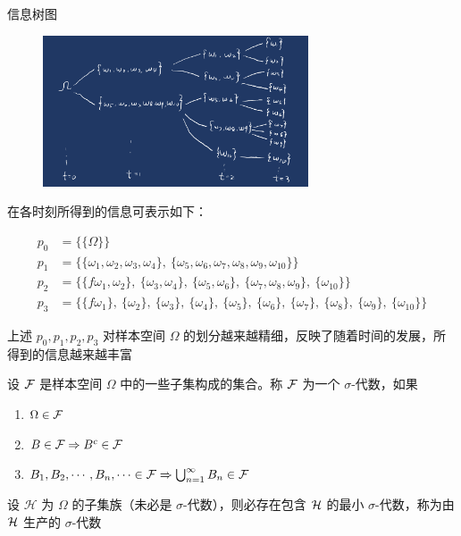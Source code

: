 信息树图

\begin{figure}[H]
    \centering
    \includegraphics[width=0.7\textwidth]{figures/信息树图.jpeg} %
\end{figure}

在各时刻所得到的信息可表示如下：

\begin{align*}
    p_0 &= \big\{ \{\Omega\} \big\} \\[8pt]
    p_1 &= \big\{ \{\omega_1, \omega_2, \omega_3, \omega_4\},\ \{\omega_5, \omega_6, \omega_7, \omega_8, \omega_9, \omega_{10}\} \big\} \\[8pt]
    p_2 &= \big\{ \{f\omega_1, \omega_2\},\ \{\omega_3, \omega_4\},\ \{\omega_5, \omega_6\},\ \{\omega_7, \omega_8, \omega_9\},\ \{\omega_{10}\} \big\} \\[8pt]
    p_3 &= \big\{ \{f\omega_1\},\ \{\omega_2\},\ \{\omega_3\},\ \{\omega_4\},\ \{\omega_5\},\ \{\omega_6\},\ \{\omega_7\},\ \{\omega_8\},\ \{\omega_9\},\ \{\omega_{10}\} \big\}
\end{align*}

上述 $p_0,p_1,p_2,p_3$ 对样本空间 $\Omega$ 的划分越来越精细，反映了随着时间的发展，所得到的信息越来越丰富

\begin{definition}[$\sigma$-代数]
    设 $\mathcal{F}$ 是样本空间 $\Omega$ 中的一些子集构成的集合。称 $\mathcal{F}$ 为一个 $\sigma$-代数，如果
    \begin{enumerate}
        \item $\Omega\in \mathcal{F}$
        \item $B\in \mathcal{F}\Rightarrow B^c\in\mathcal{F}$
        \item $B_1,B_2,\cdots,B_n,\cdots\in \mathcal{F}\Rightarrow \bigcup_{n=1}^{\infty}B_n\in \mathcal{F}$
    \end{enumerate}
\end{definition}

设 $\mathcal{H}$ 为 $\Omega$ 的子集族（未必是 $\sigma$-代数），则必存在包含 $\mathcal{H}$ 的最小 $\sigma$-代数，称为由 $\mathcal{H}$ 生产的 $\sigma$-代数

